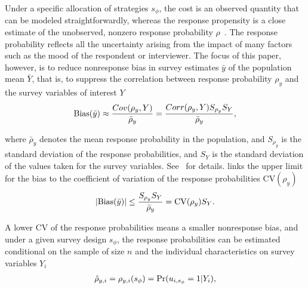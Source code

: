 \documentclass[12pt]{article}
\begin{document}
Under a specific allocation of strategies $s_\phi$, the cost is an observed quantity that can be modeled straightforwardly, whereas the response propensity is a close estimate of the unobserved, nonzero response probability $\rho$\unskip~\cite{Bethlehem:2011,Schouten:2013}.
The response probability reflects all the uncertainty arising from the impact of many factors such as the mood of the respondent or interviewer.
The focus of this paper, however, is to reduce nonresponse bias in survey estimates $\bar{y}$ of the population mean $\bar{Y}$, that is, to suppress the correlation between response probability $\rho_y$ and the survey variables of interest $Y$
\let\saveeqnno\theequation
\let\savefrac\frac
\def\dispfrac{\displaystyle\savefrac}
\begin{eqnarray*}
\let\frac\dispfrac
\gdef\theequation{}
\let\theHequation\theequation
	\textrm{Bias}(\bar{y})\approx\dfrac{Cov(\rho_y, Y)}{\bar{\rho}_y}=\dfrac{Corr(\rho_y, Y)S_{\rho_y} S_Y}{\bar{\rho}_y},
\end{eqnarray*}
\global\let\theequation\saveeqnno
\addtocounter{equation}{-1}\ignorespaces

where $\bar{\rho}_y$ denotes the mean response probability in the population, and $S_{\rho_y}$ is the standard deviation of the response probabilities, and $S_Y$ is the standard deviation of the values taken for the survey variables. See\unskip~ for details.
 links the upper limit for the bias to the coefficient of variation of the response probabilities $\mathrm{CV}(\rho_y)$
\let\saveeqnno\theequation
\let\savefrac\frac
\def\dispfrac{\displaystyle\savefrac}
\begin{eqnarray*}
\let\frac\dispfrac
\gdef\theequation{}
\let\theHequation\theequation
	|\textrm{Bias}(\bar{y})|\leq\dfrac{S_{\rho_y} S_Y}{\bar{\rho}_y}=\mathrm{CV}(\rho_y)S_Y.
\end{eqnarray*}
\global\let\theequation\saveeqnno
\addtocounter{equation}{-1}\ignorespaces

A lower CV of the response probabilities means a smaller nonresponse bias, and under a given survey design $s_\phi$, the response probabilities can be estimated conditional on the sample of size $n$ and the individual characteristics on survey variables $Y_i$
\let\saveeqnno\theequation
\let\savefrac\frac
\def\dispfrac{\displaystyle\savefrac}
\begin{eqnarray*}
\let\frac\dispfrac
\gdef\theequation{}
\let\theHequation\theequation
	\hat{\rho}_{y,i}=\rho_{y,i}(s_\phi)=\Pr(u_{i,s_\phi}=1|Y_i),
\end{eqnarray*}
\global\let\theequation\saveeqnno
\addtocounter{equation}{-1}\ignorespaces
\end{document}
